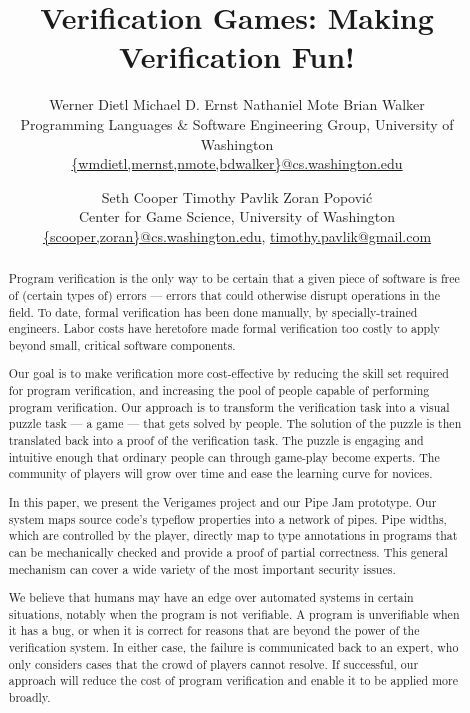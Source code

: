 \documentclass[preprint]{sig-alternate}
\begin{document}
\title{Verification Games: Making Verification Fun!}



\author{
Werner Dietl
\qquad
Michael D. Ernst
\qquad
Nathaniel Mote
\qquad
Brian Walker\\
%
{\normalsize
Programming Languages \& Software Engineering Group,
University of Washington}\\
\url{{wmdietl,mernst,nmote,bdwalker}@cs.washington.edu}
%
\and
%
Seth Cooper
\qquad
Timothy Pavlik
\qquad
Zoran Popovi\'c\\
%
{\normalsize
Center for Game Science, University of Washington}\\
\url{{scooper,zoran}@cs.washington.edu},
\url{timothy.pavlik@gmail.com}
}

\date{}

\maketitle

\begin{abstract}
Program verification is the only way to be certain that a given
piece of software is free of (certain types of) errors --- errors that
could otherwise disrupt operations in the field.  To date, formal
verification has been done manually, by specially-trained engineers.  Labor
costs have heretofore made formal verification too costly to apply beyond
small, critical software components.

Our goal is to make verification more cost-effective by reducing the skill
set required for program verification, and increasing the pool of people
capable of performing program verification.  Our approach is to transform
the verification task into a visual puzzle task --- a game --- that
gets solved by people. The solution of the puzzle is then translated
back into a proof of the verification task.
The puzzle is engaging and intuitive enough that ordinary people can through
game-play become experts.  The community of players will grow over
time and ease the learning curve for novices.

In this paper, we present the Verigames project and our
Pipe Jam prototype.  Our system maps source code's typeflow properties
into a network of pipes.
Pipe widths, which are controlled by the player, directly map to type
annotations in programs that can be mechanically checked and provide a
proof of partial correctness.
This general mechanism can cover a wide variety of the most important
security issues.

We believe that humans may have an edge over automated systems in
certain situations, notably when the program is not verifiable.  A
program is unverifiable when it has a bug, or when it is correct for
reasons that are beyond the power of the verification system.  In
either case, the failure is communicated back to an expert, who only
considers cases that the crowd of players cannot resolve.
%
If successful, our approach will reduce the cost of program verification
and enable it to be applied more broadly.


\end{abstract}
\end{document}
